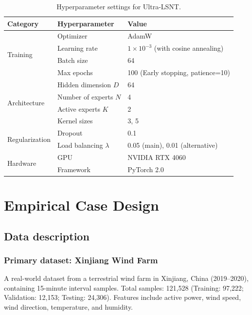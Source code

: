 \documentclass[review,3p,times,draft]{elsarticle}
\begin{document}
\begin{table}[htbp]
\centering
\caption{Hyperparameter settings for Ultra-LSNT.}
\label{tab:hyperparams}
\begin{tabular}{@{}lll@{}}
\toprule
\textbf{Category} & \textbf{Hyperparameter} & \textbf{Value} \\
\midrule
\multirow{4}{*}{Training} & Optimizer & AdamW \\
 & Learning rate & $1 \times 10^{-3}$ (with cosine annealing) \\
 & Batch size & 64 \\
 & Max epochs & 100 (Early stopping, patience=10) \\
\midrule
\multirow{4}{*}{Architecture} & Hidden dimension $D$ & 64 \\
 & Number of experts $N$ & 4 \\
 & Active experts $K$ & 2 \\
 & Kernel sizes & 3, 5 \\
\midrule
\multirow{2}{*}{Regularization} & Dropout & 0.1 \\
 & Load balancing $\lambda$ & 0.05 (main), 0.01 (alternative) \\
\midrule
\multirow{2}{*}{Hardware} & GPU & NVIDIA RTX 4060 \\
 & Framework & PyTorch 2.0 \\
\bottomrule
\end{tabular}
\end{table}

\section{Empirical Case Design}
\label{sec:design}

\subsection{Data description}

\subsubsection{Primary dataset: Xinjiang Wind Farm}
A real-world dataset from a terrestrial wind farm in Xinjiang, China (2019--2020), containing 15-minute interval samples. Total samples: 121,528 (Training: 97,222; Validation: 12,153; Testing: 24,306). Features include active power, wind speed, wind direction, temperature, and humidity.
\end{document}
